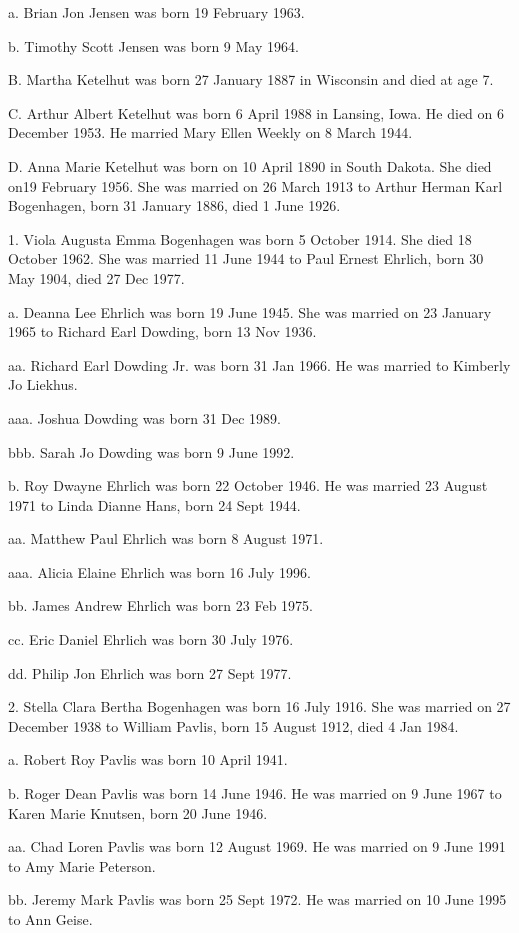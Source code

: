 \documentclass[a4paper]{article}
\begin{document}
a. Brian Jon Jensen was born 19 February 1963.

b. Timothy Scott Jensen was born 9 May 1964.

B. Martha Ketelhut was born 27 January 1887 in Wisconsin and died at age 7.

C. Arthur Albert Ketelhut was born 6 April 1988 in Lansing, Iowa.  He died on 6 December 1953.  He married Mary Ellen Weekly on 8 March 1944.

D.  Anna Marie Ketelhut was born on 10 April 1890 in South Dakota.  She died on19 February 1956.  She was married on 26 March 1913 to Arthur Herman Karl Bogenhagen, born 31 January 1886, died 1 June 1926.

1. Viola Augusta Emma Bogenhagen was born 5 October 1914.  She died 18 October 1962.  She was married 11 June 1944 to Paul Ernest Ehrlich, born 30 May 1904, died 27 Dec 1977.

a. Deanna Lee Ehrlich was born 19 June 1945.  She was married on 23 January 1965 to Richard Earl Dowding, born 13 Nov 1936.

aa. Richard Earl Dowding Jr. was born 31 Jan 1966. He was married to Kimberly Jo Liekhus.

aaa. Joshua Dowding was born 31 Dec 1989.

bbb. Sarah Jo Dowding was born 9 June 1992. 

b. Roy Dwayne Ehrlich was born 22 October 1946.  He was married 23 August 1971 to Linda Dianne Hans, born 24 Sept 1944.

aa. Matthew Paul Ehrlich was born 8 August 1971.

aaa. Alicia Elaine Ehrlich was born 16 July 1996.

bb. James Andrew Ehrlich was born 23 Feb 1975.

cc. Eric Daniel Ehrlich was born 30 July 1976.

dd. Philip Jon Ehrlich was born 27 Sept 1977.

2. Stella Clara Bertha Bogenhagen was born 16 July 1916.  She was married on 27 December 1938 to William Pavlis, born 15 August 1912, died 4 Jan 1984.

a. Robert Roy Pavlis was born 10 April 1941.

b. Roger Dean Pavlis was born 14 June 1946.  He was married on 9 June 1967 to Karen Marie Knutsen, born 20 June 1946.
 
aa. Chad Loren Pavlis was born 12 August 1969.  He was married on 9 June 1991 to Amy Marie Peterson.

bb. Jeremy Mark Pavlis was born 25 Sept 1972.  He was married on 10 June 1995 to Ann Geise.
\end{document}
